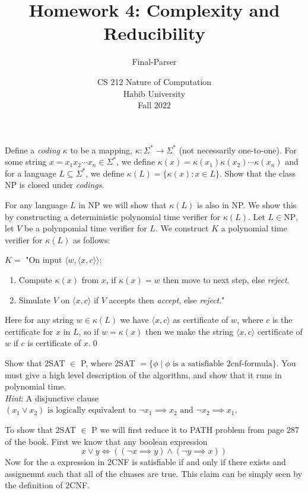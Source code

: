 \documentclass[addpoints]{exam}
\title{Homework 4: Complexity and Reducibility}
\author{Final-Parser} %
\date{CS 212 Nature of Computation\\Habib University\\Fall 2022}
\begin{document}
\maketitle

\begin{questions}

    \question[10] Define a \textit{coding} $\kappa$ to be a mapping, $\kappa:\Sigma^*\rightarrow \Sigma^*$ (not necessarily one-to-one). For some string $x = x_1x_2\cdots x_n\in\Sigma^*$, we define $\kappa(x) =\kappa(x_1)\kappa(x_2)\cdots\kappa(x_n)$ and for a language $L\subseteq \Sigma^*$, we define $\kappa(L) = \{\kappa(x): x\in L \}$. Show that the class NP is closed under \textit{codings}. 
    \begin{solution}
        For any language $L$ in NP we will show that $\kappa(L)$ is also in NP. We show this by constructing a deterministic polynomial time verifier for $\kappa(L)$. Let $L\in \mbox{NP}$, let $V$ be a polynpomial time verifier for $L$. We construct $K$ a polynomial time verifier for $\kappa(L)$ as follows:
        
        $K = $ "On input $\langle w, \langle x,c\rangle\rangle$:
        \begin{enumerate}
            \item Compute $\kappa(x)$ from $x$, if $\kappa(x) = w$ then move to next step, else \textit{reject}.
            \item Simulate $V$ on $\langle x,c\rangle$ if $V$ accepts then \textit{accept}, else \textit{reject}."
        \end{enumerate}
        Here for any string $w\in\kappa(L)$ we have $\langle x,c\rangle$ as certificate of $w$, where $c$ is the certificate for $x$ in $L$, so if $w =\kappa(x)$ then we make the string $\langle x,c\rangle$ certificate of $w$ if $c$ is certificate of $x$.\hfill\qed
    \end{solution}
    
    \question[10] Show that 2SAT $\in$  P, where 2SAT $ = \{\phi \mid\phi\text{ is a satisfiable 2cnf-formula}\}$. You must give a high level description of the algorithm, and show that it runs in polynomial time. \\ \textit{Hint}: A disjunctive clause $(x_1 \vee x_2)\text{ is logically equivalent to } \neg x_1 \implies x_2\text{ and } \neg x_2 \implies x_1$.
    \begin{solution}
        To show that 2SAT $\in$ P we will first reduce it to PATH problem from page 287 of the book. First we know that any boolean expression
        \[x \lor y \iff ((\neg x \implies y) \land (\neg y \implies x))\]
        Now for the a expression in 2CNF is satisfiable if and only if there exists and assignemnt such that all of the cluases are true. This claim can be simply seen by the definition of 2CNF. 
        

\end{solution}
\end{questions}
\end{document}
